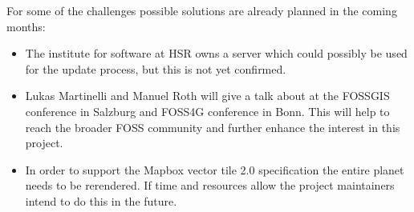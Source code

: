 For some of the challenges possible solutions are already planned in the coming months:

\begin{itemize}
    \item The institute for software at HSR owns a server which could possibly be used for the update process, but this is not yet confirmed.
    \item Lukas Martinelli and Manuel Roth will give a talk about \osmvt{} at the FOSSGIS conference in Salzburg and FOSS4G conference in Bonn. This will help to reach the broader FOSS community and further enhance the interest in this project.
    \item In order to support the Mapbox vector tile 2.0 specification the entire planet needs to be rerendered. If time and resources allow the project maintainers intend to do this in the future.
\end{itemize}


